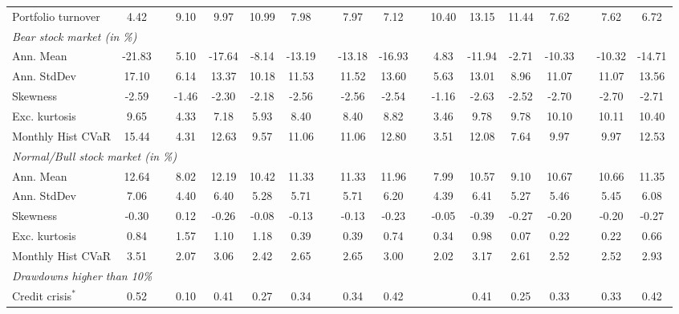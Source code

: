 \documentclass[12pt,a4paper]{article}
\begin{document}
\begin{landscape}
\begin{table}[tb]
\begin{center}
{\begin{tabular}{|lc c c cccc c cc c cccc c cc| }
 \multicolumn{2}{|l}{Portfolio turnover}  &     4.42 & &9.10 & 9.97 & 10.99 & 7.98 & & 7.97 & 7.12 & &  10.40 & 13.15 & 11.44 & 7.62 & & 7.62 & 6.72  \\
 \multicolumn{19}{|l|}{\emph{Bear stock market (in \%)}} \\
 \multicolumn{2}{|l}{Ann. Mean  }    &      -21.83 & & 5.10 & -17.64 & -8.14 & -13.19 & & -13.18 & -16.93& & 4.83 & -11.94 & -2.71 & -10.33 & & -10.32 & -14.71 \\
 \multicolumn{2}{|l}{Ann. StdDev}     &      17.10 & &6.14 & 13.37 & 10.18 & 11.53 & &11.52 & 13.60& & 5.63 & 13.01 & 8.96 & 11.07 & & 11.07 & 13.56       \\
  \multicolumn{2}{|l}{Skewness}     &         -2.59 & &-1.46 & -2.30 & -2.18 & -2.56 && -2.56 & -2.54   & & -1.16 & -2.63 & -2.52 & -2.70 & & -2.70 & -2.71 \\
    \multicolumn{2}{|l}{Exc. kurtosis}   &      9.65 & &4.33 & 7.18 & 5.93 & 8.40 & &8.40 & 8.82 & &3.46 & 9.78 & 9.78 & 10.10 & & 10.11 & 10.40     \\
 \multicolumn{2}{|l}{Monthly Hist  CVaR}   &	 15.44 && 4.31 & 12.63 & 9.57 & 11.06 & &11.06 & 12.80& & 3.51 & 12.08 & 7.64 & 9.97 & & 9.97 & 12.53 \\
 \multicolumn{19}{|l|}{\emph{Normal/Bull stock market (in \%)}} \\
 \multicolumn{2}{|l}{Ann. Mean  } 	     &    12.64 & & 8.02 & 12.19 & 10.42 & 11.33 & & 11.33 & 11.96  & & 7.99 & 10.57 & 9.10 & 10.67 & &10.66 & 11.35    \\
 \multicolumn{2}{|l}{Ann. StdDev }       &    7.06 & &4.40 & 6.40 & 5.28 & 5.71 & &5.71 & 6.20    &&  4.39 & 6.41 & 5.27 & 5.46 && 5.45 & 6.08 \\
  \multicolumn{2}{|l}{Skewness }       &      -0.30 & &0.12 & -0.26 & -0.08 & -0.13 & &-0.13 & -0.23 &&  -0.05 & -0.39 & -0.27 & -0.20 && -0.20 & -0.27   \\
    \multicolumn{2}{|l}{Exc. kurtosis }   &     0.84 & &1.57 & 1.10 & 1.18 & 0.39 & &0.39 & 0.74  & & 0.34 & 0.98 & 0.07 & 0.22 & &0.22 & 0.66 \\
 \multicolumn{2}{|l}{Monthly Hist  CVaR}   &    3.51 & &2.07 & 3.06 & 2.42 & 2.65 & &2.65 & 3.00 & &  2.02 & 3.17 & 2.61 & 2.52 & & 2.52 & 2.93 \\
 \hline \multicolumn{19}{|l|}{ \emph{Drawdowns higher than 10\%}  }  \\
 \multicolumn{2}{|l}{Credit crisis$^{*}$}       &  0.52 & & 0.10 & 0.41 & 0.27 & 0.34 & & 0.34 & 0.42   &  &   & 0.41 & 0.25 & 0.33 & &  0.33 & 0.42  \\

\end{tabular}}
\end{center}
\end{table}
\end{landscape}
\end{document}
